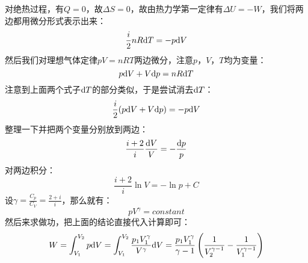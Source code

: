         \begin{prove}
            对绝热过程，有$Q = 0$，故$\Delta S = 0$，故由热力学第一定律有$\Delta U = -W$，我们将两边都用微分形式表示出来：
            \begin{equation}
                \frac{i}{2}nR\mathrm{d}{T} = -p\mathrm{d}{V} 
                \nonumber
            \end{equation}
            然后我们对理想气体定律$pV = nRT$两边微分，注意$p$，$V$，$T$均为变量：
            \begin{equation}
                p\mathrm{d}{V} + V\mathrm{d}{p} = nR \mathrm{d}{T}
                \nonumber
            \end{equation}
            注意到上面两个式子$\mathrm{d}{T}$的部分类似，于是尝试消去$\mathrm{d}{T}$：
            \begin{equation}
                \frac{i}{2} (p\mathrm{d}{V} + V\mathrm{d}{p}) = -p\mathrm{d}{V}
                \nonumber
            \end{equation}
            整理一下并把两个变量分别放到两边：
            \begin{equation}
                \frac{i+2}{i} \frac{\mathrm{d}{V}}{V}  = -\frac{\mathrm{d}{p}}{p}
                \nonumber
            \end{equation}
            对两边积分：
            \begin{equation}
                \frac{i+2}{i} \ln V  =-\ln p + C
                \nonumber
            \end{equation}
            设$\gamma = \frac{C_p}{C_V} = \frac{2+i}{i}$，那么就有：
            \begin{equation}
                pV^{\gamma} = constant
            \end{equation}
            然后来求做功，把上面的结论直接代入计算即可：
            \begin{equation}
                W = \int_{V_1}^{V_2} p\mathrm{d}{V} =\int_{V_1}^{V_2} \frac{p_{1}V_{1}^{\gamma}}{V^{\gamma}}\mathrm{d}{V}
                  = \frac{p_{1}V_{1}^{\gamma}}{\gamma - 1}\left(\frac{1}{V_{2}^{\gamma-1}}-\frac{1}{V_1^{\gamma-1}}\right)
            \end{equation}
        \end{prove}
